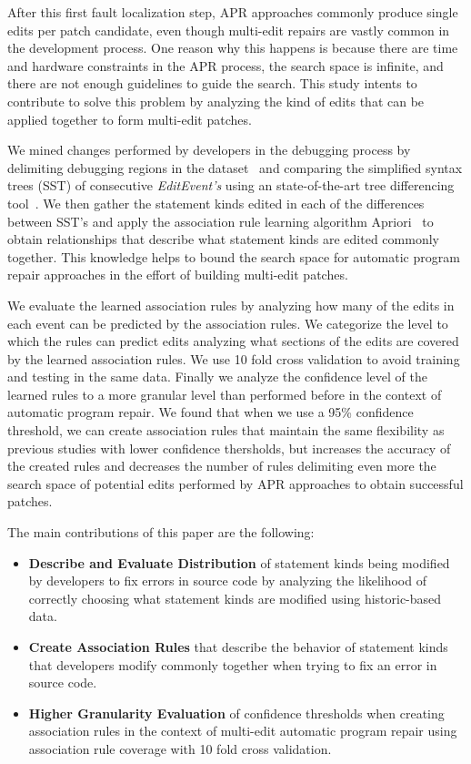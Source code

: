 \documentclass[sigconf]{acmart}
\begin{document}
After this first fault localization step, APR approaches 
commonly produce single edits per patch
candidate, even though multi-edit repairs are vastly common in the 
development process. One reason why this happens is because
there are time and hardware constraints in the APR process,
the search space is infinite, and there are not enough guidelines
to guide the search.
This study intents to contribute to
solve this problem by analyzing  
the kind of edits that can be applied together to form
multi-edit patches.

We mined changes performed by developers in the debugging
process by delimiting debugging regions in the dataset~\cite{msr18challenge} and comparing the simplified syntax
trees (SST) of consecutive \textit{EditEvent's} using an 
state-of-the-art tree differencing tool~\cite{Pawlik16Apted}.
We then gather the statement kinds edited in each of the 
differences between SST's and apply the association
rule learning algorithm Apriori~\cite{Agrawal94}
to obtain relationships that describe what statement kinds
are edited commonly together. This knowledge helps to 
bound the search space for automatic program repair approaches
in the effort of building multi-edit patches.

We evaluate the learned association rules by 
analyzing how many of the edits
in each event can be predicted by the association rules.
We categorize the level to which the rules can predict edits
analyzing what sections of the edits are covered by the 
learned association rules. 
We use 10 fold
cross validation to avoid training and testing in the same data.
Finally we analyze
the confidence level of the learned rules to a more granular 
level than performed before in the context of automatic
program repair. We found that when we use a 95\% confidence
threshold, we can create association
rules that maintain the same flexibility as previous
studies with lower confidence thersholds, but increases
the accuracy of the created rules and decreases the number of rules
delimiting even more the search space of potential edits
performed by APR approaches to obtain successful patches.

The main contributions of this paper are the following:
\begin{itemize}
\item \textbf{Describe and Evaluate Distribution} of statement kinds being
modified by developers to fix errors in source code by
analyzing the likelihood of correctly choosing what statement
kinds are modified using historic-based data.

\item \textbf{Create Association Rules} that describe the behavior
of statement kinds that developers modify commonly together when
trying to fix an error in source code.  

\item \textbf{Higher Granularity Evaluation} 
of confidence thresholds when creating
association rules in the context of multi-edit automatic
program repair using association rule coverage with 
10 fold cross validation.

\end{itemize}
\end{document}
